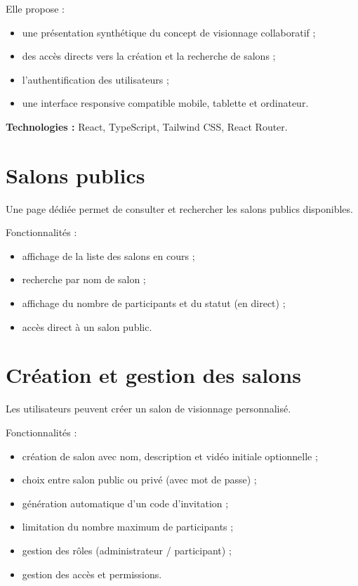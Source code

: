 \documentclass[12pt,a4paper]{report}
\begin{document}
Elle propose :
\begin{itemize}
  \item une présentation synthétique du concept de visionnage collaboratif ;
  \item des accès directs vers la création et la recherche de salons ;
  \item l’authentification des utilisateurs ;
  \item une interface responsive compatible mobile, tablette et ordinateur.
\end{itemize}

\textbf{Technologies :} React, TypeScript, Tailwind CSS, React Router.

\section{Salons publics}

Une page dédiée permet de consulter et rechercher les salons publics disponibles.

Fonctionnalités :
\begin{itemize}
  \item affichage de la liste des salons en cours ;
  \item recherche par nom de salon ;
  \item affichage du nombre de participants et du statut (en direct) ;
  \item accès direct à un salon public.
\end{itemize}

\section{Création et gestion des salons}

Les utilisateurs peuvent créer un salon de visionnage personnalisé.

Fonctionnalités :
\begin{itemize}
  \item création de salon avec nom, description et vidéo initiale optionnelle ;
  \item choix entre salon public ou privé (avec mot de passe) ;
  \item génération automatique d’un code d’invitation ;
  \item limitation du nombre maximum de participants ;
  \item gestion des rôles (administrateur / participant) ;
  \item gestion des accès et permissions.
\end{itemize}
\end{document}

